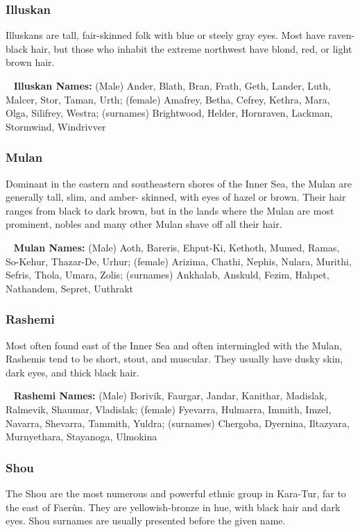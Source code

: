 \subsubsection{Illuskan}
Illuskans are tall, fair-skinned folk with blue or steely gray eyes. Most have raven-black hair, but those who inhabit the extreme northwest have blond, red, or light brown hair.

\ \newline
\noindent \textbf{Illuskan Names:} \hangindent=0.3cm (Male) Ander, Blath, Bran, Frath, Geth, Lander, Luth, Malcer, Stor, Taman, Urth; (female) Amafrey, Betha, Cefrey, Kethra, Mara, Olga, Silifrey, Westra; (surnames) Brightwood, Helder, Hornraven, Lackman, Stormwind, Windrivver

\subsubsection{Mulan}
Dominant in the eastern and southeastern shores of the Inner Sea, the Mulan are generally tall, slim, and amber- skinned, with eyes of hazel or brown. Their hair ranges from black to dark brown, but in the lands where the Mulan are most prominent, nobles and many other Mulan shave off all their hair.

\ \newline
\noindent \textbf{Mulan Names:} \hangindent=0.3cm (Male) Aoth, Bareris, Ehput-Ki, Kethoth, Mumed, Ramas, So-Kehur, Thazar-De, Urhur; (female) Arizima, Chathi, Nephis, Nulara, Murithi, Sefris, Thola, Umara, Zolis; (surnames) Ankhalab, Anskuld, Fezim, Hahpet, Nathandem, Sepret, Uuthrakt

\subsubsection{Rashemi}
Most often found east of the Inner Sea and often intermingled with the Mulan, Rashemis tend to be short, stout, and muscular. They usually have dusky skin, dark eyes, and thick black hair.

\ \newline
\noindent \textbf{Rashemi Names:} \hangindent=0.3cm (Male) Borivik, Faurgar, Jandar, Kanithar, Madislak, Ralmevik, Shaumar, Vladislak; (female) Fyevarra, Hulmarra, Immith, Imzel, Navarra, Shevarra, Tammith, Yuldra; (surnames) Chergoba, Dyernina, Iltazyara, Murnyethara, Stayanoga, Ulmokina

\subsubsection{Shou}
The Shou are the most numerous and powerful ethnic group in Kara-Tur, far to the east of Faerûn. They are yellowish-bronze in hue, with black hair and dark eyes. Shou surnames are usually presented before the given name.

